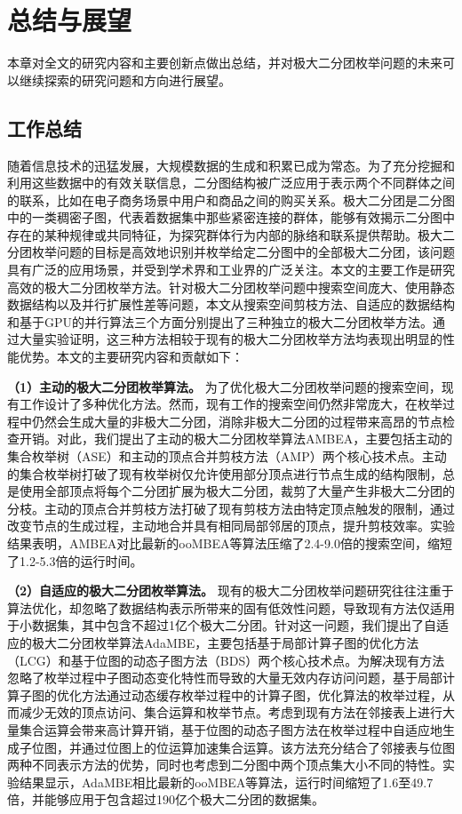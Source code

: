 \chapter{总结与展望}

本章对全文的研究内容和主要创新点做出总结，并对极大二分团枚举问题的未来可以继续探索的研究问题和方向进行展望。

\section{工作总结}

随着信息技术的迅猛发展，大规模数据的生成和积累已成为常态。为了充分挖掘和利用这些数据中的有效关联信息，二分图结构被广泛应用于表示两个不同群体之间的联系，比如在电子商务场景中用户和商品之间的购买关系。极大二分团是二分图中的一类稠密子图，代表着数据集中那些紧密连接的群体，能够有效揭示二分图中存在的某种规律或共同特征，为探究群体行为内部的脉络和联系提供帮助。极大二分团枚举问题的目标是高效地识别并枚举给定二分图中的全部极大二分团，该问题具有广泛的应用场景，并受到学术界和工业界的广泛关注。本文的主要工作是研究高效的极大二分团枚举方法。针对极大二分团枚举问题中搜索空间庞大、使用静态数据结构以及并行扩展性差等问题，本文从搜索空间剪枝方法、自适应的数据结构和基于GPU的并行算法三个方面分别提出了三种独立的极大二分团枚举方法。通过大量实验证明，这三种方法相较于现有的极大二分团枚举方法均表现出明显的性能优势。本文的主要研究内容和贡献如下：

\textbf{（1）主动的极大二分团枚举算法。} 为了优化极大二分团枚举问题的搜索空间，现有工作设计了多种优化方法。然而，现有工作的搜索空间仍然非常庞大，在枚举过程中仍然会生成大量的非极大二分团，消除非极大二分团的过程带来高昂的节点检查开销。对此，我们提出了主动的极大二分团枚举算法AMBEA，主要包括主动的集合枚举树（ASE）和主动的顶点合并剪枝方法（AMP）两个核心技术点。主动的集合枚举树打破了现有枚举树仅允许使用部分顶点进行节点生成的结构限制，总是使用全部顶点将每个二分团扩展为极大二分团，裁剪了大量产生非极大二分团的分枝。主动的顶点合并剪枝方法打破了现有剪枝方法由特定顶点触发的限制，通过改变节点的生成过程，主动地合并具有相同局部邻居的顶点，提升剪枝效率。实验结果表明，AMBEA对比最新的ooMBEA等算法压缩了2.4-9.0倍的搜索空间，缩短了1.2-5.3倍的运行时间。

\textbf{（2）自适应的极大二分团枚举算法。} 现有的极大二分团枚举问题研究往往注重于算法优化，却忽略了数据结构表示所带来的固有低效性问题，导致现有方法仅适用于小数据集，其中包含不超过1亿个极大二分团。针对这一问题，我们提出了自适应的极大二分团枚举算法AdaMBE，主要包括基于局部计算子图的优化方法（LCG）和基于位图的动态子图方法（BDS）两个核心技术点。为解决现有方法忽略了枚举过程中子图动态变化特性而导致的大量无效内存访问问题，基于局部计算子图的优化方法通过动态缓存枚举过程中的计算子图，优化算法的枚举过程，从而减少无效的顶点访问、集合运算和枚举节点。考虑到现有方法在邻接表上进行大量集合运算会带来高计算开销，基于位图的动态子图方法在枚举过程中自适应地生成子位图，并通过位图上的位运算加速集合运算。该方法充分结合了邻接表与位图两种不同表示方法的优势，同时也考虑到二分图中两个顶点集大小不同的特性。实验结果显示，AdaMBE相比最新的ooMBEA等算法，运行时间缩短了1.6至49.7倍，并能够应用于包含超过190亿个极大二分团的数据集。

